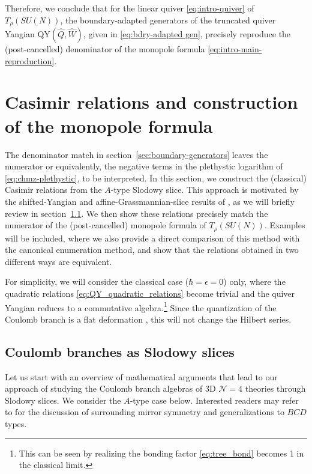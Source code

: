 \documentclass[12pt,a4paper]{article}
\newcommand{\eps}{\epsilon}
\begin{document}
\bigskip


Therefore, we conclude that for the linear quiver \eqref{eq:intro-quiver} of $T_\rho(SU(N))$, the boundary-adapted generators of the truncated quiver Yangian QY$(\hat{Q},\hat W)$, given in \eqref{eq:bdry-adapted gen}, precisely reproduce the (post-cancelled) denominator of the monopole formula \eqref{eq:intro-main-reproduction}.




 \section{Casimir relations and construction of the monopole formula}
\label{sec:slodowy-reproduction}

The denominator match in section~\ref{sec:boundary-generators} leaves the numerator or equivalently, the
negative terms in the plethystic logarithm of \eqref{eq:chmz-plethystic}, to be interpreted. In this section, we construct the (classical) Casimir relations from the $A$-type Slodowy slice. This approach is motivated by the shifted-Yangian and affine-Grassmannian-slice results
of \cite{MV2002,MirkovicVybornov2002,KWWY2012,KamnitzerEtAl2018,BrundanKleshchev2004}, as we will briefly review in section~\ref{sec:CB as Ss}. We then show these relations precisely match the numerator of the (post-cancelled) monopole formula of $T_\rho(SU(N))$.
Examples will be included, where we also provide a direct comparison of this method with the canonical enumeration method, and show that the relations obtained in two different ways are equivalent.

For simplicity, we will consider the classical case ($\hbar=\eps= 0$) only, where the quadratic relations \eqref{eq:QY_quadratic_relations} become trivial and the quiver Yangian reduces to a commutative algebra.\footnote{This can be seen by realizing the bonding factor \eqref{eq:tree_bond} becomes 1 in the classical limit.} Since the quantization of the Coulomb branch is a flat deformation \cite{BFN2018}, this will not change the Hilbert series. 



\subsection{Coulomb branches as Slodowy slices}
\label{sec:CB as Ss}
Let us start with an overview of mathematical arguments that lead to our approach of studying the Coulomb branch algebras of 3D $\mathcal N=4$ theories through Slodowy slices. We consider the $A$-type case below. Interested readers may refer to \cite{Cabrera_2019} 
for the discussion of surrounding
mirror symmetry and generalizations to $BCD$ types.
\end{document}
